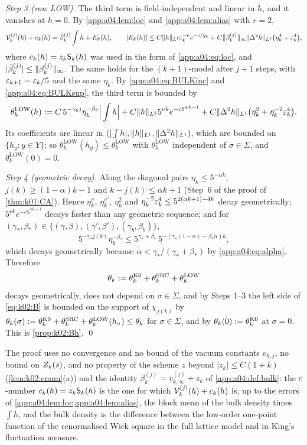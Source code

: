 \emph{Step 3 (row LOW).} The third term is field-independent and linear in $h$, and it vanishes at $h=0$. By \cref{app:a04:lem:loc} and \cref{app:a04:lem:alias} with $r=2$,
\[
\mathcal V^{(j)}_k(h)+c_k(h)=\bar\beta^{(j)}_k\int h+E_k(h),\qquad
|E_k(h)|\le C\lVert h\rVert_{L^1}\varepsilon_k^{-\nu}e^{-c/\eta_k}+C\lVert \beta^{(j)}_k\rVert_\infty\lVert \Delta^2h\rVert_{L^1}\big(\eta_k^{4}+\varepsilon_k^{4}\big),
\]
where $c_k(h)=z_k\mathsf S_k(h)$ was used in the form of \eqref{app:a04:eq:loc}, and $|\bar\beta^{(j)}_k|\le\lVert \beta^{(j)}_k\rVert_\infty$. The same holds for the $(k+1)$-model after $j+1$ steps, with $\varepsilon_{k+1}=\varepsilon_k/5$ and the same $\eta_k$. By \eqref{app:a04:eq:BULKinc} and \eqref{app:a04:eq:BULKsup}, the third term is bounded by
\[
\theta^{\mathrm{LOW}}_k(h):= C\,5^{-\gamma_bj}\eta_k^{-\beta_b}\Big|\int h\Big|+C\lVert h\rVert_{L^1}5^{\nu k}e^{-c5^{\alpha k-1}}+C\lVert \Delta^2h\rVert_{L^1}\big(\eta_k^{2}+\eta_k^{-2}\varepsilon_k^{4}\big).
\]
Its coefficients are linear in $(|\int h|,\lVert h\rVert_{L^1},\lVert \Delta^2h\rVert_{L^1})$, which are bounded on $\{h_y:y\in Y\}$; so $\theta^{\mathrm{LOW}}_k(h_y)\le\theta^{\mathrm{LOW}}_k$ with $\theta^{\mathrm{LOW}}_k$ independent of $\sigma\in\Sigma$, and $\theta^{\mathrm{LOW}}_k(0)=0$.

\emph{Step 4 (geometric decay).} Along the diagonal pairs $\eta_k\le5^{-\alpha k}$, $j(k)\ge(1-\alpha)k-1$ and $k-j(k)\le\alpha k+1$ (Step~6 of the proof of \cref{thm:k01:CA}). Hence $\eta_k^{\sigma}$, $\eta_k^{\sigma'}$, $\eta_k^{2}$ and $\eta_k^{-2}\varepsilon_k^{4}\le5^{2(\alpha k+1)-4k}$ decay geometrically; $5^{\nu k}e^{-c5^{\alpha k-1}}$ decays faster than any geometric sequence; and for $(\gamma_*,\beta_*)\in\{(\gamma,\beta),(\gamma',\beta'),(\gamma_b,\beta_b)\}$,
\[
5^{-\gamma_*j(k)}\eta_k^{-\beta_*}\le5^{\gamma_*+\beta_*}\,5^{-(\gamma_*(1-\alpha)-\beta_*\alpha)k},
\]
which decays geometrically because $\alpha<\gamma_*/(\gamma_*+\beta_*)$ by \eqref{app:a04:eq:alpha}. Therefore
\[
\theta_k:=\theta^{\mathrm{K0}}_k+\theta^{\mathrm{SRC}}_k+\theta^{\mathrm{LOW}}_k
\]
decays geometrically, does not depend on $\sigma\in\Sigma$, and by Steps 1--3 the left side of \eqref{eq:k02:B} is bounded on the support of $\chi_{j(k)}$ by $\theta_k(\sigma):=\theta^{\mathrm{K0}}_k+\theta^{\mathrm{SRC}}_k+\theta^{\mathrm{LOW}}_k(h_\sigma)\le\theta_k$ for $\sigma\in\Sigma$, and by $\theta_k(0):=\theta^{\mathrm{K0}}_k$ at $\sigma=0$. This is \cref{prop:k02:Bh}. \qed

\begin{remark}
The proof uses no convergence and no bound of the vacuum constants $v_{k,j}$, no bound on $Z_{k}(s)$, and no property of the scheme $z$ beyond $|z_k|\le C(1+k)$ (\cref{lem:k02:cnum}(a)) and the identity $\beta^{(j)}_k=v^{(j)}_{k,\infty}+z_k$ of \cref{app:a04:def:bulk}: the $c$-number $c_k(h)=z_k\mathsf S_k(h)$ is the one for which $\mathcal V^{(j)}_k(h)+c_k(h)$ is, up to the errors of \cref{app:a04:lem:loc,app:a04:lem:alias}, the block mean of the bulk density times $\int h$, and the bulk density is the difference between the low-order one-point function of the renormalised Wick square in the full lattice model and in King's fluctuation measure.
\end{remark}
